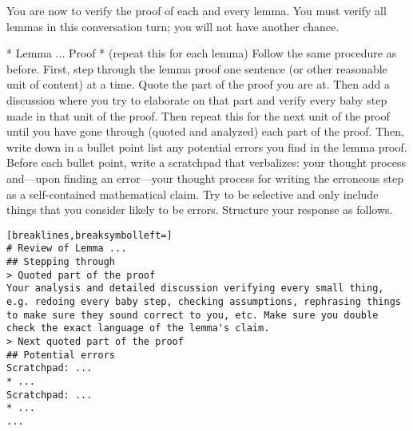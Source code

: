 \begin{tcolorbox}[breakable,title=Verification Prompt 6]
You are now to verify the proof of each and every lemma. You must verify all lemmas in this conversation turn; you will not have another chance.

* Lemma ... Proof * (repeat this for each lemma)
Follow the same procedure as before. First, step through the lemma proof one sentence (or other reasonable unit of content) at a time. Quote the part of the proof you are at. Then add a discussion where you try to elaborate on that part and verify every baby step made in that unit of the proof. Then repeat this for the next unit of the proof until you have gone through (quoted and analyzed) each part of the proof.
Then, write down in a bullet point list any potential errors you find in the lemma proof. Before each bullet point, write a scratchpad that verbalizes: your thought process and---upon finding an error---your thought process for writing the erroneous step as a self-contained mathematical claim. Try to be selective and only include things that you consider likely to be errors.
Structure your response as follows.
\begin{Verbatim}[breaklines,breaksymbolleft=]
# Review of Lemma ...
## Stepping through
> Quoted part of the proof
Your analysis and detailed discussion verifying every small thing, e.g. redoing every baby step, checking assumptions, rephrasing things to make sure they sound correct to you, etc. Make sure you double check the exact language of the lemma's claim.
> Next quoted part of the proof
## Potential errors
Scratchpad: ...
* ...
Scratchpad: ...
* ...
...
\end{Verbatim}
\end{tcolorbox}

